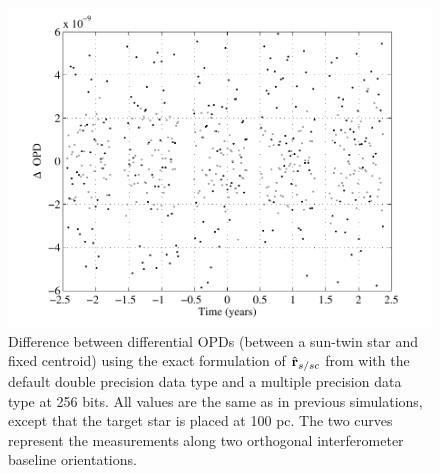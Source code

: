  \begin{figure}[ht]
\centering
\includegraphics[width=5.5in]{./figures/precision_test}
 \caption[Numerical encoding precision test]{Difference between differential OPDs (between a sun-twin star and fixed centroid) using the exact formulation of $\hat{\mathbf{r}}_{s/sc}$ from  with the default double precision data type and a multiple precision data type at 256 bits.  All values are the same as in previous simulations, except that the target star is placed at 100 pc. The two curves represent the measurements along two orthogonal interferometer baseline orientations. \label{fig:precision_test}}
\end{figure} 
%
